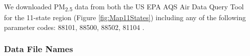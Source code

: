 We downloaded PM\textsubscript{2.5} data from both the US EPA AQS Air Data Query Tool \citep{EPAAirData2017} %
for the 11-state region (Figure \ref{fig:Map11States}) including any of the following parameter codes: 88101, 88500, 88502, 81104 \citep{EPANPM25Memo2017,EPANPM25Parameters2017,EPANAllParameters2017}. %







\subsubsection*{Data File Names}


